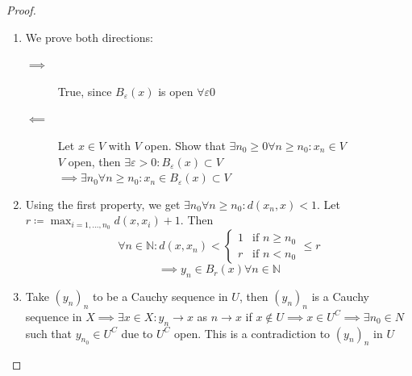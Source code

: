 \documentclass{article}
\numberwithin{lecref}{section}
\begin{document}
\begin{proof}
	\begin{enumerate}
		\item We prove both directions:
			\begin{description}
				\item[$\implies$]
					True, since $B_\varepsilon(x)$ is open $\forall \varepsilon 0$
				\item[$\impliedby$]
					Let $x \in V$ with $V$ open. Show that $\exists n_0 \geq 0 \forall n \geq n_0: x_n \in V$ \\
					$V$ open, then $\exists \varepsilon > 0: B_{\varepsilon}(x) \subset V$ \\
					$\implies \exists n_0 \forall n \geq n_0: x_n \in B_{\varepsilon}(x) \subset V$
			\end{description}
		\item Using the first property, we get $\exists n_0 \forall n \geq n_0: d(x_n, x) < 1$.
			Let $r \coloneqq \max_{i=1,\dots,n_0} d(x, x_i) + 1$. Then
			\[ \forall n \in \mathbb N: d(x, x_n) < \begin{cases} 1 & \text{if } n \geq n_0 \\ r & \text{if } n < n_0 \end{cases} \leq r \]
			\[ \implies y_n \in B_r(x) \forall n \in \mathbb N \]
		\item
			Take $(y_n)_n$ to be a Cauchy sequence in $U$, then $(y_n)_n$ is a Cauchy sequence in $X \implies \exists x \in X: y_n \to x$ as $n \to x$ if $x \not\in U \implies x \in U^C \implies \exists n_0 \in N$ such that $y_{n_0} \in U^C$ due to $U^C$ open. This is a contradiction to $(y_n)_n$ in $U$
	\end{enumerate}
\end{proof}
\end{document}
